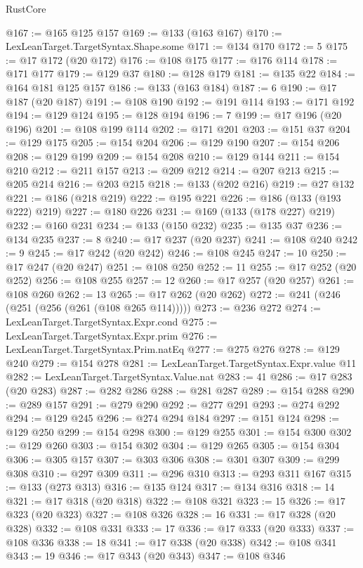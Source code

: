 \begin{lexlean}{RustCore}
\begin{coremodule}
@167 := @165 @125 @157
@169 := @133 (@163 @167)
@170 := LexLeanTarget.TargetSyntax.Shape.some
@171 := @134 @170
@172 := 5
@175 := @17 @172 (@20 @172)
@176 := @108 @175
@177 := @176 @114
@178 := @171 @177
@179 := @129 @37
@180 := @128 @179
@181 := @135 @22
@184 := @164 @181 @125 @157
@186 := @133 (@163 @184)
@187 := 6
@190 := @17 @187 (@20 @187)
@191 := @108 @190
@192 := @191 @114
@193 := @171 @192
@194 := @129 @124
@195 := @128 @194
@196 := 7
@199 := @17 @196 (@20 @196)
@201 := @108 @199 @114
@202 := @171 @201
@203 := @151 @37
@204 := @129 @175
@205 := @154 @204
@206 := @129 @190
@207 := @154 @206
@208 := @129 @199
@209 := @154 @208
@210 := @129 @144
@211 := @154 @210
@212 := @211 @157
@213 := @209 @212
@214 := @207 @213
@215 := @205 @214
@216 := @203 @215
@218 := @133 (@202 @216)
@219 := @27 @132
@221 := @186 (@218 @219)
@222 := @195 @221
@226 := @186 (@133 (@193 @222) @219)
@227 := @180 @226
@231 := @169 (@133 (@178 @227) @219)
@232 := @160 @231
@234 := @133 (@150 @232)
@235 := @135 @37
@236 := @134 @235
@237 := 8
@240 := @17 @237 (@20 @237)
@241 := @108 @240
@242 := 9
@245 := @17 @242 (@20 @242)
@246 := @108 @245
@247 := 10
@250 := @17 @247 (@20 @247)
@251 := @108 @250
@252 := 11
@255 := @17 @252 (@20 @252)
@256 := @108 @255
@257 := 12
@260 := @17 @257 (@20 @257)
@261 := @108 @260
@262 := 13
@265 := @17 @262 (@20 @262)
@272 := @241 (@246 (@251 (@256 (@261 (@108 @265 @114)))))
@273 := @236 @272
@274 := LexLeanTarget.TargetSyntax.Expr.cond
@275 := LexLeanTarget.TargetSyntax.Expr.prim
@276 := LexLeanTarget.TargetSyntax.Prim.natEq
@277 := @275 @276
@278 := @129 @240
@279 := @154 @278
@281 := LexLeanTarget.TargetSyntax.Expr.value @11
@282 := LexLeanTarget.TargetSyntax.Value.nat
@283 := 41
@286 := @17 @283 (@20 @283)
@287 := @282 @286
@288 := @281 @287
@289 := @154 @288
@290 := @289 @157
@291 := @279 @290
@292 := @277 @291
@293 := @274 @292
@294 := @129 @245
@296 := @274 @294 @184
@297 := @151 @124
@298 := @129 @250
@299 := @154 @298
@300 := @129 @255
@301 := @154 @300
@302 := @129 @260
@303 := @154 @302
@304 := @129 @265
@305 := @154 @304
@306 := @305 @157
@307 := @303 @306
@308 := @301 @307
@309 := @299 @308
@310 := @297 @309
@311 := @296 @310
@313 := @293 @311 @167
@315 := @133 (@273 @313)
@316 := @135 @124
@317 := @134 @316
@318 := 14
@321 := @17 @318 (@20 @318)
@322 := @108 @321
@323 := 15
@326 := @17 @323 (@20 @323)
@327 := @108 @326
@328 := 16
@331 := @17 @328 (@20 @328)
@332 := @108 @331
@333 := 17
@336 := @17 @333 (@20 @333)
@337 := @108 @336
@338 := 18
@341 := @17 @338 (@20 @338)
@342 := @108 @341
@343 := 19
@346 := @17 @343 (@20 @343)
@347 := @108 @346

\end{coremodule}
\end{lexlean}
